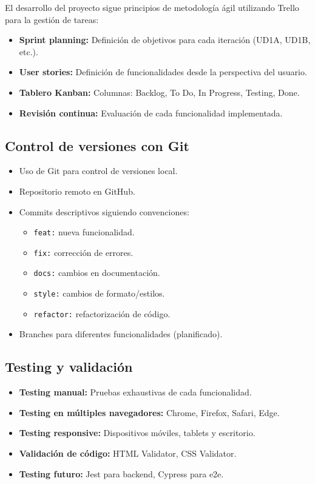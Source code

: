 \documentclass[12pt,a4paper]{article}
\begin{document}
El desarrollo del proyecto sigue principios de metodología ágil utilizando Trello para la gestión de tareas:

\begin{itemize}
    \item \textbf{Sprint planning:} Definición de objetivos para cada iteración (UD1A, UD1B, etc.).
    \item \textbf{User stories:} Definición de funcionalidades desde la perspectiva del usuario.
    \item \textbf{Tablero Kanban:} Columnas: Backlog, To Do, In Progress, Testing, Done.
    \item \textbf{Revisión continua:} Evaluación de cada funcionalidad implementada.
\end{itemize}

\subsection{Control de versiones con Git}

\begin{itemize}
    \item Uso de Git para control de versiones local.
    \item Repositorio remoto en GitHub.
    \item Commits descriptivos siguiendo convenciones:
    \begin{itemize}
        \item \texttt{feat:} nueva funcionalidad.
        \item \texttt{fix:} corrección de errores.
        \item \texttt{docs:} cambios en documentación.
        \item \texttt{style:} cambios de formato/estilos.
        \item \texttt{refactor:} refactorización de código.
    \end{itemize}
    \item Branches para diferentes funcionalidades (planificado).
\end{itemize}

\subsection{Testing y validación}

\begin{itemize}
    \item \textbf{Testing manual:} Pruebas exhaustivas de cada funcionalidad.
    \item \textbf{Testing en múltiples navegadores:} Chrome, Firefox, Safari, Edge.
    \item \textbf{Testing responsive:} Dispositivos móviles, tablets y escritorio.
    \item \textbf{Validación de código:} HTML Validator, CSS Validator.
    \item \textbf{Testing futuro:} Jest para backend, Cypress para e2e.
\end{itemize}
\end{document}
